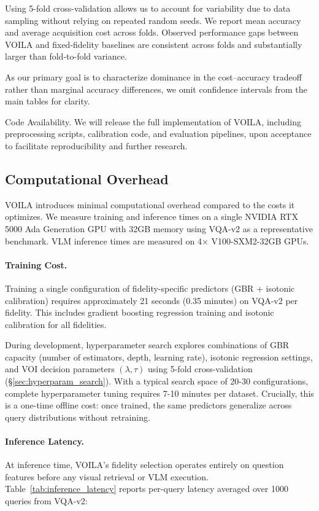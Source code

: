 Using 5-fold cross-validation allows us to account for variability due to data sampling without relying on repeated random seeds.
We report mean accuracy and average acquisition cost across folds.
Observed performance gaps between \textsc{VOILA} and fixed-fidelity baselines are consistent across folds and substantially larger than fold-to-fold variance.

As our primary goal is to characterize dominance in the cost--accuracy tradeoff rather than marginal accuracy differences, we omit confidence intervals from the main tables for clarity.

Code Availability. We will release the full implementation of VOILA, including preprocessing scripts, calibration code,
and evaluation pipelines, upon acceptance to facilitate reproducibility and further research.



\subsection{Computational Overhead}
\label{sec:computational_overhead}

VOILA introduces minimal computational overhead compared to the costs it optimizes. We measure training and inference times on a single NVIDIA RTX 5000 Ada Generation GPU with 32GB memory using VQA-v2 as a representative benchmark. VLM inference times are measured on 4× V100-SXM2-32GB GPUs.

\paragraph{Training Cost.} 
Training a single configuration of fidelity-specific predictors (GBR + isotonic calibration) requires approximately 21 seconds (0.35 minutes) on VQA-v2 per fidelity. This includes gradient boosting regression training and isotonic calibration for all fidelities. 

During development, hyperparameter search explores combinations of GBR capacity (number of estimators, depth, learning rate), isotonic regression settings, and VOI decision parameters $(\lambda, \tau)$ using 5-fold cross-validation (§\ref{sec:hyperparam_search}). With a typical search space of 20-30 configurations, complete hyperparameter tuning requires 7-10 minutes per dataset. Crucially, this is a one-time offline cost: once trained, the same predictors generalize across query distributions without retraining.

\paragraph{Inference Latency.}
At inference time, VOILA's fidelity selection operates entirely on question features before any visual retrieval or VLM execution. Table~\ref{tab:inference_latency} reports per-query latency averaged over 1000 queries from VQA-v2:

